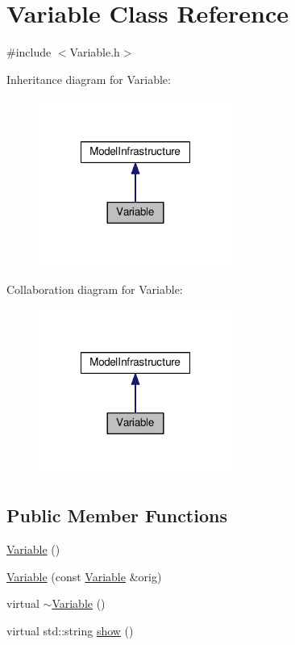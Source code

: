 \hypertarget{class_variable}{\section{Variable Class Reference}
\label{class_variable}
}


{\ttfamily \#include $<$Variable.\-h$>$}



Inheritance diagram for Variable\-:
\nopagebreak
\begin{figure}[H]
\begin{center}
\leavevmode
\includegraphics[width=180pt]{class_variable__inherit__graph}
\end{center}
\end{figure}


Collaboration diagram for Variable\-:
\nopagebreak
\begin{figure}[H]
\begin{center}
\leavevmode
\includegraphics[width=180pt]{class_variable__coll__graph}
\end{center}
\end{figure}
\subsection*{Public Member Functions}
\begin{DoxyCompactItemize}
\item 
\hyperlink{class_variable_a5716c9dcafcc8cf59a6f6b5dac3ec7a2}{Variable} ()
\item 
\hyperlink{class_variable_a1974dd984e1ee5bf74f25d03301108c1}{Variable} (const \hyperlink{class_variable}{Variable} \&orig)
\item 
virtual \hyperlink{class_variable_acfc14d0ad77af53025f890b4d3a7745a}{$\sim$\-Variable} ()
\item 
virtual std\-::string \hyperlink{class_variable_a8bd0a772bb32fd630e252306306cd154}{show} ()
\end{DoxyCompactItemize}
